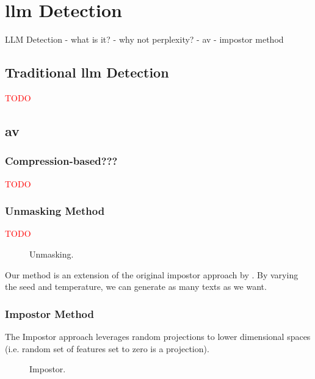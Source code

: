 \chapter{\acs{llm} Detection}
\label{chap:llm_detection}
    LLM Detection
    - what is it?
    - why not perplexity?
    - av
    - impostor method

\section{Traditional \acs{llm} Detection}
\label{sec:llm_detection}
\textcolor{red}{TODO}






\section{\acl{av}}

\subsection{Compression-based???}
\textcolor{red}{TODO}


\subsection{Unmasking Method}
\textcolor{red}{TODO}


\begin{figure}[htbp]
    \centering
    
    \caption{Unmasking.}
    \label{fig:unmasking}
\end{figure}
Our method is an extension of the original impostor approach by \citet{koppel_determining_2014}.
By varying the seed and temperature, we can generate as many texts as we want.
  
\subsection{Impostor Method}

The Impostor approach leverages random projections to lower dimensional spaces (i.e. random set of features set to zero is a projection).
\begin{figure}[htbp]
    \centering
    
    \caption{Impostor.}
    \label{fig:impostor}
\end{figure}



